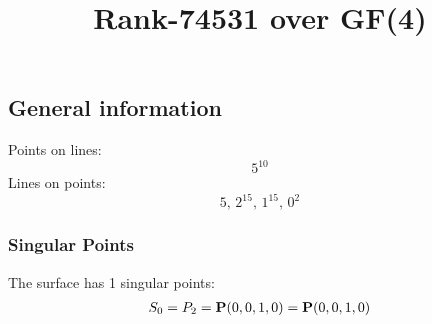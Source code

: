\documentclass{article}
\newcommand\setTBstruts{\def\T{\rule{0pt}{2.6ex}}%
\def\B{\rule[-1.2ex]{0pt}{0pt}}}
\newcommand{\bP}{{\bf P}}
\begin{document}
 
\setTBstruts



{\allowdisplaybreaks%






\title{Rank-74531 over GF(4)}
\author{}%
\maketitle%
%
{}



\subsection*{General information}
Points on lines:
$$
5^{10}$$
Lines on points:
$$
5,\,2^{15},\,1^{15},\,0^2$$
\subsubsection*{Singular Points}
The surface has 1 singular points:\\
\begin{align*}
S_{0} &= P_{2}=\bP(0, 0, 1, 0) = \bP(0, 0, 1, 0)\\
\end{align*}
}
\end{document}
